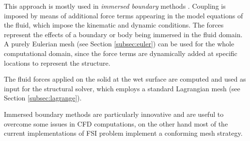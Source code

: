 This approach is mostly used in \textit{immersed boundary} methods \cite{kajishima2017immersed}. Coupling is imposed by means of additional force terms appearing in the model equations of the fluid, which impose the kinematic and dynamic conditions.
The forces represent the effects of a boundary or body being immersed in the fluid domain. A purely Eulerian mesh (see Section \ref{subsec:euler}) can be used for the whole computational domain, since
the force terms are dynamically added at specific locations to represent the structure.

The fluid forces applied on the solid at the wet surface are computed and used as input for the structural solver, which employs a standard Lagrangian mesh (see Section \ref{subsec:lagrange}).

Immersed boundary methods are particularly innovative and are useful to overcome some issues in CFD computations, on the other hand most of the current implementations of FSI problem implement a conforming mesh strategy.


